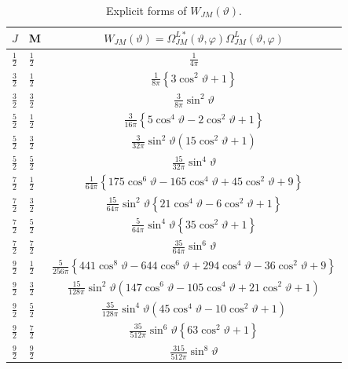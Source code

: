 \begin{table}[tbh]
\begin{center}
\caption{Explicit forms of $W_{J M}(\vartheta)$.}
\renewcommand{\arraystretch}{1.8}
\label{chap7:tab:1}
\begin{tabular}{l|l|c}
\hline
$J$ & M & $W_{J M}(\vartheta)=\Omega_{J M}^{L*}(\vartheta, \varphi) \Omega_{J M}^{L}(\vartheta, \varphi)$ \\
\hline
$\frac{1}{2}$ & $\frac{1}{2}$ & $\frac{1}{4 \pi}$ \\
$\frac{3}{2}$ & $\frac{1}{2}$ & $\frac{1}{8 \pi}\left\{3 \cos ^{2} \vartheta+1\right\}$ \\
$\frac{3}{2}$ & $\frac{3}{2}$ & $\frac{3}{8 \pi} \sin^2\vartheta$ \\
$\frac{5}{2}$ & $\frac{1}{2}$ & $\frac{3}{16 \pi}\left\{5 \cos ^{4} \vartheta-2 \cos ^{2} \vartheta+1\right\}$ \\
$\frac{5}{2}$ & $\frac{3}{2}$ & $\frac{3}{32 \pi} \sin ^{2} \vartheta\left(15 \cos ^{2} \vartheta+1\right)$ \\
$\frac{5}{2}$ & $\frac{5}{2}$ & $\frac{15}{32 \pi} \sin ^{4} \vartheta$ \\
$\frac{7}{2}$ & $\frac{1}{2}$ & $\frac{1}{64 \pi}\left\{175 \cos ^{6} \vartheta-165 \cos ^{4} \vartheta+45 \cos ^{2} \vartheta+9\right\}$ \\
$\frac{7}{2}$ & $\frac{3}{2}$ & $\frac{15}{64 \pi} \sin ^{2} \vartheta\left\{21 \cos ^{4} \vartheta-6 \cos ^{2} \vartheta+1\right\}$ \\
$\frac{7}{2}$ & $\frac{5}{2}$ & $\frac{5}{64 \pi} \sin ^{4} \vartheta\left\{35 \cos ^{2} \vartheta+1\right\}$ \\
$\frac{7}{2}$ & $\frac{7}{2}$ & $\frac{35}{64 \pi} \sin ^{6} \vartheta$ \\
$\frac{9}{2}$ & $\frac{1}{2}$ & $\frac{5}{256 \pi}\left\{441 \cos ^{8} \vartheta-644 \cos ^{6} \vartheta+294 \cos ^{4} \vartheta-36 \cos ^{2} \vartheta+9\right\}$ \\
$\frac{9}{2}$ & $\frac{3}{2}$ & $\frac{15}{128 \pi} \sin ^{2} \vartheta\left(147 \cos ^{6} \vartheta-105 \cos ^{4} \vartheta+21 \cos ^{2} \vartheta+1\right)$ \\
$\frac{9}{2}$ & $\frac{5}{2}$ & $\frac{35}{128 \pi} \sin ^{4} \vartheta\left(45 \cos ^{4} \vartheta-10 \cos ^{2} \vartheta+1\right)$ \\
$\frac{9}{2}$ & $\frac{7}{2}$ & $\frac{35}{512 \pi} \sin ^{6} \vartheta\left\{63 \cos ^{2} \vartheta+1\right\}$ \\
$\frac{9}{2}$ & $\frac{9}{2}$ & $\frac{315}{512 \pi} \sin ^{8} \vartheta$ \\

\end{tabular}
\end{center}
\end{table}
